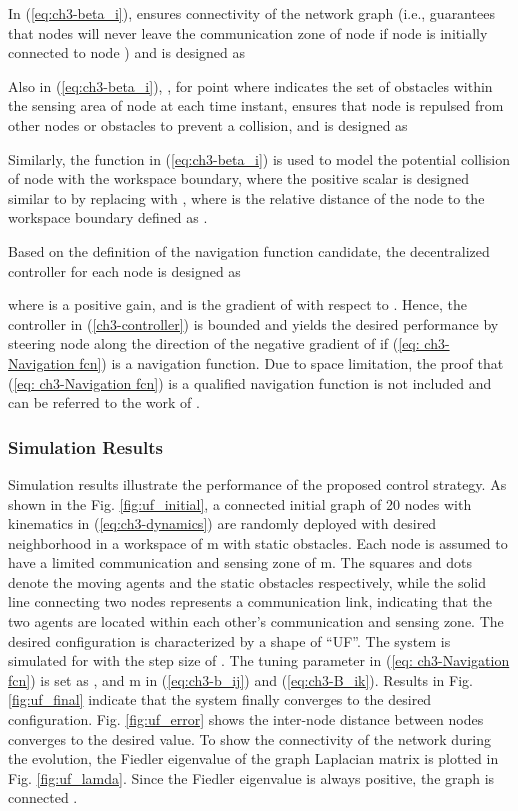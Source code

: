 \documentclass[english]{IOS-Book-Article}
\theoremstyle{definition}
\theoremstyle{definition}
\begin{document}
In (\ref{eq:ch3-beta_i}), 
ensures connectivity of the network graph (i.e., guarantees that nodes
 will never leave the communication
zone of node  if node  is initially connected to node )
and is designed as\ 

Also in (\ref{eq:ch3-beta_i}), ,
for point  where 
indicates the set of obstacles within the sensing area of node 
at each time instant, ensures that node  is repulsed from other
nodes or obstacles to prevent a collision, and is designed as

Similarly, the function  in (\ref{eq:ch3-beta_i}) is used
to model the potential collision of node  with the workspace boundary,
where the positive scalar  is designed similar
to  by replacing  with , where 
is the relative distance of the node  to the workspace boundary
defined as .

Based on the definition of the navigation function candidate, the
decentralized controller for each node is designed as

where  is a positive gain, and  is
the gradient of  with respect to . Hence, the
controller in (\ref{ch3-controller}) is bounded and yields the desired
performance by steering node  along the direction of the negative
gradient of  if (\ref{eq: ch3-Navigation fcn}) is a
navigation function. Due to space limitation, the proof that (\ref{eq: ch3-Navigation fcn})
is a qualified navigation function is not included and can be referred
to the work of \cite{Kan.Dani.ea2012}.


\subsubsection{Simulation Results}

Simulation results illustrate the performance of the proposed control
strategy. As shown in the Fig. \ref{fig:uf_initial}, a connected
initial graph of 20 nodes with kinematics in (\ref{eq:ch3-dynamics})
are randomly deployed with desired neighborhood in a workspace of
 m with static obstacles. Each node is assumed to have a limited
communication and sensing zone of  m. The squares and dots
denote the moving agents and the static obstacles respectively, while
the solid line connecting two nodes represents a communication link,
indicating that the two agents are located within each other's communication
and sensing zone. The desired configuration is characterized by a
shape of {}``UF''. The system is simulated for  with the step
size of . The tuning parameter  in (\ref{eq: ch3-Navigation fcn})
is set as , and  m in (\ref{eq:ch3-b_ij})
and (\ref{eq:ch3-B_ik}). Results in Fig. \ref{fig:uf_final} indicate
that the system finally converges to the desired configuration. Fig.
\ref{fig:uf_error} shows the inter-node distance between nodes converges
to the desired value. To show the connectivity of the network during
the evolution, the Fiedler eigenvalue of the graph Laplacian matrix
is plotted in Fig. \ref{fig:uf_lamda}. Since the Fiedler eigenvalue
is always positive, the graph is connected \cite{Godsil2001}.
\end{document}
